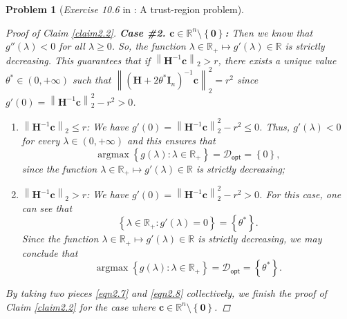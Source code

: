 \documentclass[11pt]{article}
\newtheorem{problem}{Problem}
\DeclareMathOperator*{\argmax}{argmax}
\numberwithin{equation}{problem}
\begin{document}
\begin{problem} [\emph{Exercise 10.6} in \cite{calafiore2014optimization}: A trust-region problem]
{\begin{proof} [Proof of Claim \ref{claim2.2}]
\indent \textbf{Case \#2. $\mathbf{c} \in \mathbb{R}^n \setminus \left\{ \mathbf{0} \right\}$:} Then we know that $g'' (\lambda) < 0$ for all $\lambda \geq 0$. So, the function $\lambda \in \mathbb{R}_{+} \mapsto g'(\lambda) \in \mathbb{R}$ is strictly decreasing. This guarantees that if $\left\| \mathbf{H}^{-1} \mathbf{c} \right\|_2 > r$, there exists a unique value $\theta^* \in \left( 0, +\infty \right)$ such that $\left\| \left( \mathbf{H} + 2 \theta^* \mathbf{I}_n \right)^{-1} \mathbf{c} \right\|_{2}^2 = r^2$ since $g' (0) = \left\| \mathbf{H}^{-1} \mathbf{c} \right\|_{2}^2 - r^2 > 0$.
\begin{enumerate} [label=(\roman*)]
    \item $\left\| \mathbf{H}^{-1} \mathbf{c} \right\|_{2} \leq r$: We have $g' (0) = \left\| \mathbf{H}^{-1} \mathbf{c} \right\|_{2}^2 - r^2 \leq 0$. Thus, $g' (\lambda) < 0$ for every $\lambda \in \left( 0, +\infty \right)$ and this ensures that
    \begin{equation}
        \label{eqn2.7}
        \argmax \left\{ g(\lambda) : \lambda \in \mathbb{R}_{+} \right\} = \mathcal{D}_{\textsf{opt}} = \left\{ 0 \right\},
    \end{equation}
    since the function $\lambda \in \mathbb{R}_{+} \mapsto g'(\lambda) \in \mathbb{R}$ is strictly decreasing;
    \item $\left\| \mathbf{H}^{-1} \mathbf{c} \right\|_{2} > r$: We have $g' (0) = \left\| \mathbf{H}^{-1} \mathbf{c} \right\|_{2}^2 - r^2 > 0$. For this case, one can see that
    \begin{equation*}
        \left\{ \lambda \in \mathbb{R}_{+} : g' (\lambda) = 0 \right\} = \left\{ \theta^* \right\}.
    \end{equation*}
    Since the function $\lambda \in \mathbb{R}_{+} \mapsto g'(\lambda) \in \mathbb{R}$ is strictly decreasing, we may conclude that
    \begin{equation}
        \label{eqn2.8}
        \argmax \left\{ g(\lambda) : \lambda \in \mathbb{R}_{+} \right\} = \mathcal{D}_{\textsf{opt}} = \left\{ \theta^* \right\}.
    \end{equation}
\end{enumerate}
By taking two pieces \eqref{eqn2.7} and \eqref{eqn2.8} collectively, we finish the proof of Claim \ref{claim2.2} for the case where $\mathbf{c} \in \mathbb{R}^n \setminus \left\{ \mathbf{0} \right\}$.

\end{proof}

}
\end{problem}
\end{document}
